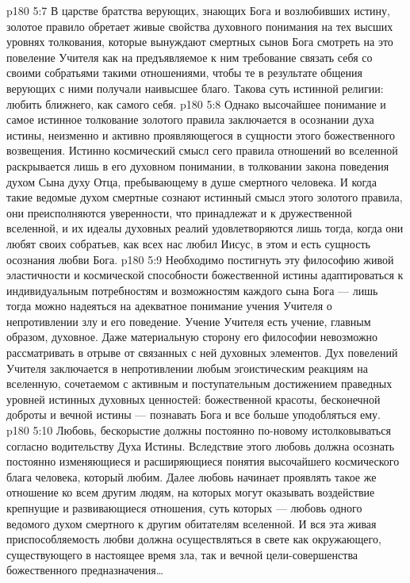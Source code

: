 \vs p180 5:7 В царстве братства верующих, знающих Бога и возлюбивших истину, золотое правило обретает живые свойства духовного понимания на тех высших уровнях толкования, которые вынуждают смертных сынов Бога смотреть на это повеление Учителя как на предъявляемое к ним требование связать себя со своими собратьями такими отношениями, чтобы те в результате общения верующих с ними получали наивысшее благо. Такова суть истинной религии: любить ближнего, как самого себя.
\vs p180 5:8 Однако высочайшее понимание и самое истинное толкование золотого правила заключается в осознании духа истины, неизменно и активно проявляющегося в сущности этого божественного возвещения. Истинно космический смысл сего правила отношений во вселенной раскрывается лишь в его духовном понимании, в толковании закона поведения духом Сына духу Отца, пребывающему в душе смертного человека. И когда такие ведомые духом смертные сознают истинный смысл этого золотого правила, они преисполняются уверенности, что принадлежат и к дружественной вселенной, и их идеалы духовных реалий удовлетворяются лишь тогда, когда они любят своих собратьев, как всех нас любил Иисус, в этом и есть сущность осознания любви Бога.
\vs p180 5:9 Необходимо постигнуть эту философию живой эластичности и космической способности божественной истины адаптироваться к индивидуальным потребностям и возможностям каждого сына Бога --- лишь тогда можно надеяться на адекватное понимание учения Учителя о непротивлении злу и его поведение. Учение Учителя есть учение, главным образом, духовное. Даже материальную сторону его философии невозможно рассматривать в отрыве от связанных с ней духовных элементов. Дух повелений Учителя заключается в непротивлении любым эгоистическим реакциям на вселенную, сочетаемом с активным и поступательным достижением праведных уровней истинных духовных ценностей: божественной красоты, бесконечной доброты и вечной истины --- познавать Бога и все больше уподобляться ему.
\vs p180 5:10 Любовь, бескорыстие должны постоянно по\hyp{}новому истолковываться согласно водительству Духа Истины. Вследствие этого любовь должна осознать постоянно изменяющиеся и расширяющиеся понятия высочайшего космического блага человека, который любим. Далее любовь начинает проявлять такое же отношение ко всем другим людям, на которых могут оказывать воздействие крепнущие и развивающиеся отношения, суть которых --- любовь одного ведомого духом смертного к другим обитателям вселенной. И вся эта живая приспособляемость любви должна осуществляться в свете как окружающего, существующего в настоящее время зла, так и вечной цели\hyp{}совершенства божественного предназначения\ldots
